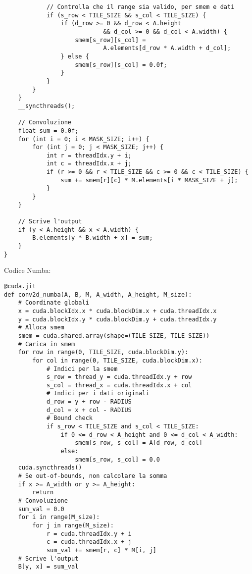 \begin{questions}
\begin{solution}
\begin{verbatim}
            // Controlla che il range sia valido, per smem e dati
            if (s_row < TILE_SIZE && s_col < TILE_SIZE) {
                if (d_row >= 0 && d_row < A.height 
                            && d_col >= 0 && d_col < A.width) {
                    smem[s_row][s_col] =
                            A.elements[d_row * A.width + d_col];
                } else {
                    smem[s_row][s_col] = 0.0f;
                }
            }
        }
    }
    __syncthreads();
    
    // Convoluzione
    float sum = 0.0f;
    for (int i = 0; i < MASK_SIZE; i++) {
        for (int j = 0; j < MASK_SIZE; j++) {
            int r = threadIdx.y + i;
            int c = threadIdx.x + j;
            if (r >= 0 && r < TILE_SIZE && c >= 0 && c < TILE_SIZE) {
                sum += smem[r][c] * M.elements[i * MASK_SIZE + j];
            }
        }
    }
    
    // Scrive l'output
    if (y < A.height && x < A.width) {
        B.elements[y * B.width + x] = sum;
    }
}
        \end{verbatim}
        
        Codice Numba:
        \begin{verbatim}
@cuda.jit
def conv2d_numba(A, B, M, A_width, A_height, M_size):
    # Coordinate globali
    x = cuda.blockIdx.x * cuda.blockDim.x + cuda.threadIdx.x
    y = cuda.blockIdx.y * cuda.blockDim.y + cuda.threadIdx.y
    # Alloca smem 
    smem = cuda.shared.array(shape=(TILE_SIZE, TILE_SIZE))
    # Carica in smem
    for row in range(0, TILE_SIZE, cuda.blockDim.y):
        for col in range(0, TILE_SIZE, cuda.blockDim.x):
            # Indici per la smem
            s_row = thread_y = cuda.threadIdx.y + row
            s_col = thread_x = cuda.threadIdx.x + col
            # Indici per i dati originali
            d_row = y + row - RADIUS
            d_col = x + col - RADIUS
            # Bound check
            if s_row < TILE_SIZE and s_col < TILE_SIZE:
                if 0 <= d_row < A_height and 0 <= d_col < A_width:
                    smem[s_row, s_col] = A[d_row, d_col]
                else:
                    smem[s_row, s_col] = 0.0
    cuda.syncthreads()
    # Se out-of-bounds, non calcolare la somma
    if x >= A_width or y >= A_height:
        return
    # Convoluzione
    sum_val = 0.0
    for i in range(M_size):
        for j in range(M_size):
            r = cuda.threadIdx.y + i
            c = cuda.threadIdx.x + j
            sum_val += smem[r, c] * M[i, j]
    # Scrive l'output
    B[y, x] = sum_val
        \end{verbatim}
    \end{solution}
    

\end{questions}
